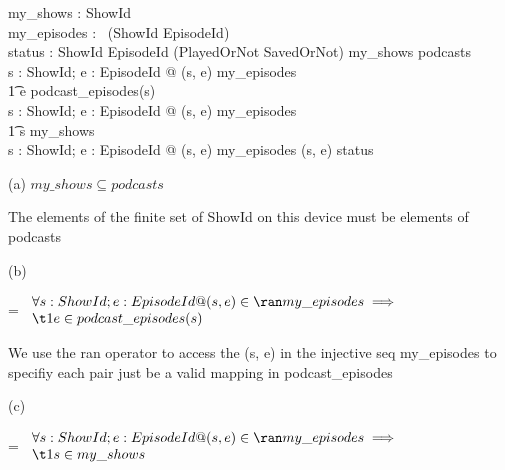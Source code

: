 \documentclass[a4paper,10pt,fleqn]{article}
\begin{document}
\begin{axdef}
my\_shows : \finset ShowId \\
my\_episodes : \iseq~(ShowId \cross EpisodeId) \\
status : ShowId \cross EpisodeId \pfun (PlayedOrNot \cross SavedOrNot)
\where
my\_shows \subseteq podcasts \\
\forall s : ShowId; e : EpisodeId @ (s, e) \in \ran my\_episodes \implies \\
\t1 e \in podcast\_episodes(s) \\
\forall s : ShowId; e : EpisodeId @ (s, e) \in \ran my\_episodes \implies \\
\t1 s \in my\_shows \\
\forall s : ShowId; e : EpisodeId @ (s, e) \in \ran my\_episodes \iff (s, e) \in \dom status
\end{axdef}

\noindent\hspace*{\parindent}(a) $my\_shows \subseteq podcasts$

\bigskip

\setlength{\leftskip}{\dimexpr\parindent+2em\relax}
\noindent The elements of the finite set of ShowId on this device must be elements of podcasts

\bigskip

\setlength{\leftskip}{0pt}
\medskip

\noindent\hspace*{\parindent}(b)

\setlength{\leftskip}{\dimexpr\parindent+2em\relax}
\savedleftskip=\leftskip
\noindent
$\displaystyle
\begin{array}{l}
\forall s : ShowId; e : EpisodeId @ (s, e) \in \ran my\_episodes \implies \\
\t1 e \in podcast\_episodes(s)
\end{array}$

\bigskip


\bigskip

\setlength{\leftskip}{\dimexpr\parindent+2em\relax}
\noindent We use the ran operator to access the (s, e) in the injective seq my\_episodes to specifiy each pair just be a valid mapping in podcast\_episodes

\bigskip

\setlength{\leftskip}{0pt}
\medskip

\noindent\hspace*{\parindent}(c)

\setlength{\leftskip}{\dimexpr\parindent+2em\relax}
\savedleftskip=\leftskip
\noindent
$\displaystyle
\begin{array}{l}
\forall s : ShowId; e : EpisodeId @ (s, e) \in \ran my\_episodes \implies \\
\t1 s \in my\_shows
\end{array}$
\end{document}

